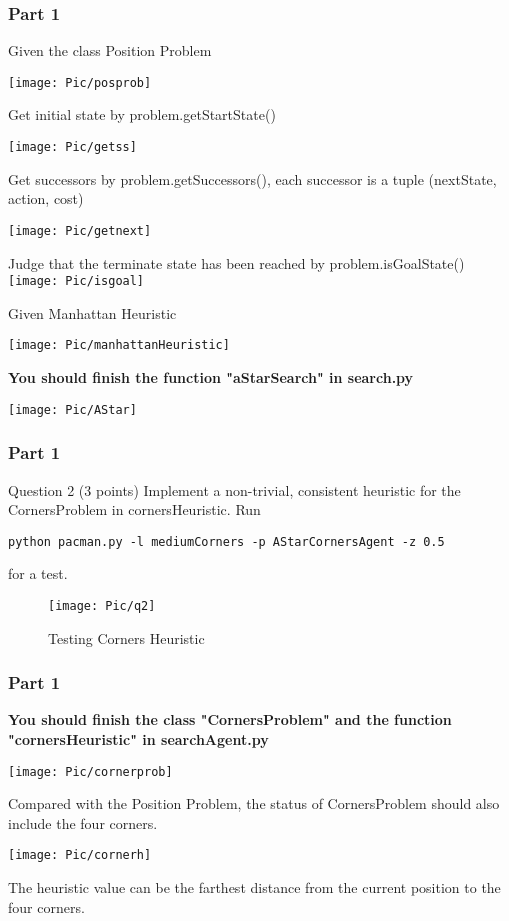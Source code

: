 \documentclass{beamer}
\begin{document}
\begin{frame}
  \frametitle{Part 1}
      Given the class Position Problem
      
      \texttt{[image: Pic/posprob]}

      Get initial state by problem.getStartState()
      
      \texttt{[image: Pic/getss]}
      
      Get successors by problem.getSuccessors(), each successor is a tuple (nextState, action, cost)
      
      \texttt{[image: Pic/getnext]}
    
      Judge that the terminate state has been reached by problem.isGoalState()
      \texttt{[image: Pic/isgoal]}

\end{frame}

\begin{frame}

      Given Manhattan Heuristic

      \texttt{[image: Pic/manhattanHeuristic]}

      \textbf{You should finish the function "aStarSearch" in search.py}

	  
      \texttt{[image: Pic/AStar]}
\end{frame}


\begin{frame}
  \frametitle{Part 1}
  \begin{block}{Question 2 (3 points)}
    Implement a non-trivial, consistent heuristic for the CornersProblem in cornersHeuristic. Run \begin{scriptsize}\texttt{python pacman.py -l mediumCorners -p AStarCornersAgent -z 0.5}\end{scriptsize} for a test.
    \begin{figure}[ht]
      \centering
      \texttt{[image: Pic/q2]}
      \caption{Testing Corners Heuristic}
    \end{figure}
  \end{block}
\end{frame}

\begin{frame}
  \frametitle{Part 1}

      \textbf{You should finish the class "CornersProblem" and the function "cornersHeuristic" in searchAgent.py}

      \texttt{[image: Pic/cornerprob]}

      Compared with the Position Problem, the status of CornersProblem should also include the four corners.

      \texttt{[image: Pic/cornerh]}

	  The heuristic value can be the farthest distance from the current position to the four corners.
\end{frame}
\end{document}
